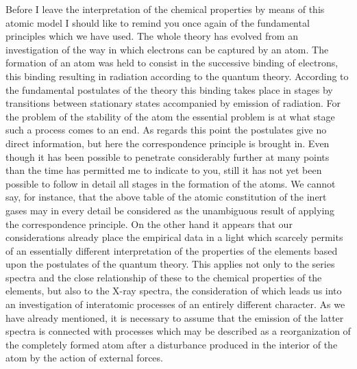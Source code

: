 Before I leave the interpretation of the chemical properties by
means of this atomic model I should like to remind you once again
of the fundamental principles which we have used. The whole
theory has evolved from an investigation of the way in which
electrons can be captured by an atom. The formation of an atom
was held to consist in the successive binding of electrons, this
binding resulting in radiation according to the quantum theory.
According to the fundamental postulates of the theory this binding
takes place in stages by transitions between stationary states
accompanied by emission of radiation. For the problem of the
stability of the atom the essential problem is at what stage such a
process comes to an end. As regards this point the postulates give
no direct information, but here the correspondence principle is
brought in. Even though it has been possible to penetrate considerably
further at many points than the time has permitted me
to indicate to you, still it has not yet been possible to follow in
detail all stages in the formation of the atoms. We cannot say, for
instance, that the above table of the atomic constitution of the
inert gases may in every detail be considered as the unambiguous
result of applying the correspondence principle. On the other hand
it appears that our considerations already place the empirical data
in a light which scarcely permits of an essentially different interpretation
of the properties of the elements based upon the postulates of
the quantum theory. This applies not only to the series spectra
and the close relationship of these to the chemical properties of the
elements, but also to the X-ray spectra, the consideration of which
leads us into an investigation of interatomic processes of an entirely
different character. As we have already mentioned, it is necessary
to assume that the emission of the latter spectra is connected with
processes which may be described as a reorganization of the completely
formed atom after a disturbance produced in the interior
of the atom by the action of external forces.




